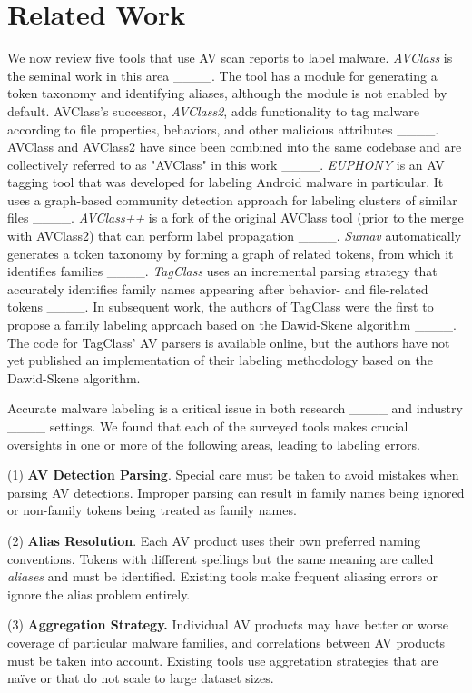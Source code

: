 \section{Related Work}
\label{sec:related_work}

We now review five tools that use AV scan reports to label malware. \textit{AVClass} is the seminal work in this area ____. The tool has a module for generating a token taxonomy and identifying aliases, although the module is not enabled by default. AVClass's successor, \textit{AVClass2}, adds functionality to tag malware according to file properties, behaviors, and other malicious attributes ____. AVClass and AVClass2 have since been combined into the same codebase and are collectively referred to as "AVClass" in this work ____. \textit{EUPHONY} is an AV tagging tool that was developed for labeling Android malware in particular. It uses a graph-based community detection approach for labeling clusters of similar files ____. \textit{AVClass++} is a fork of the original AVClass tool (prior to the merge with AVClass2) that can perform label propagation ____. \textit{Sumav} automatically generates a token taxonomy by forming a graph of related tokens, from which it identifies families ____. \textit{TagClass} uses an incremental parsing strategy that accurately identifies family names appearing after behavior- and file-related tokens ____. In subsequent work, the authors of TagClass were the first to propose a family labeling approach based on the Dawid-Skene algorithm ____.
The code for TagClass' AV parsers is available online, but the authors have not yet published an implementation of their labeling methodology based on the Dawid-Skene algorithm.

Accurate malware labeling is a critical issue in both research ____ and industry ____ settings. We found that each of the surveyed tools makes crucial oversights in one or more of the following areas, leading to labeling errors.

    (1) \textbf{AV Detection Parsing}. Special care must be taken to avoid mistakes when parsing AV detections. Improper parsing can result in family names being ignored or non-family tokens being treated as family names.
    
    (2)  \textbf{Alias Resolution}. Each AV product uses their own preferred naming conventions. Tokens with different spellings but the same meaning are called \emph{aliases} and must be identified. Existing tools make frequent aliasing errors or ignore the alias problem entirely. 
    
    (3) \textbf{Aggregation Strategy.} Individual AV products may have better or worse coverage of particular malware families, and correlations between AV products must be taken into account. Existing tools use aggretation strategies that are na\"ive or that do not scale to large dataset sizes.
